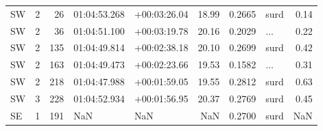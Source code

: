 \begin{tabular}{lrrllrrlr}
  SW &       2 &     26 &  01:04:53.268 &  +00:03:26.04 &  18.99 &    0.2665 &       surd &        0.14 \\
  SW &       2 &     36 &  01:04:51.100 &  +00:03:19.78 &  20.16 &    0.2029 &        ... &        0.22 \\
  SW &       2 &    135 &  01:04:49.814 &  +00:02:38.18 &  20.10 &    0.2699 &       surd &        0.42 \\
  SW &       2 &    163 &  01:04:49.473 &  +00:02:23.66 &  19.53 &    0.1582 &        ... &        0.31 \\
  SW &       2 &    218 &  01:04:47.988 &  +00:01:59.05 &  19.55 &    0.2812 &       surd &        0.63 \\
  SW &       3 &    228 &  01:04:52.934 &  +00:01:56.95 &  20.37 &    0.2769 &       surd &        0.45 \\
  SE &       1 &    191 &           NaN &           NaN &    NaN &    0.2700 &       surd &         NaN \\
\bottomrule
\end{tabular}

